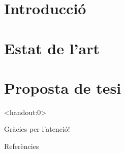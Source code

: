 \documentclass[
   catalan,
   ]{beamer}
\begin{document}


\section{Introducció}


\section{Estat de l'art}



\section{Proposta de tesi}





\begin{frame}<handout:0>
  \addtocounter{framenumber}{-1}

  \begin{center}
    {\huge
      Gràcies per l'atenció!
    }
  \end{center}

\end{frame}





\appendix




\begin{frame}[allowframebreaks]{Referències}

\printbibliography

\end{frame}
\end{document}
